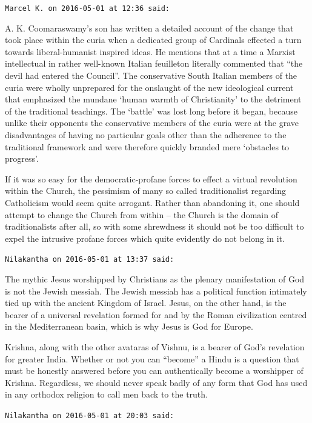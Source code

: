 \begin{footnotesize}
\begin{sffamily}
\texttt{Marcel K. on 2016-05-01 at 12:36 said:}

A. K. Coomaraswamy's son has written a detailed account of the change that took place within the curia when a dedicated group of Cardinals effected a turn towards liberal-humanist inspired ideas. He mentions that at a time a Marxist intellectual in rather well-known Italian feuilleton literally commented that ``the devil had entered the Council''. The conservative South Italian members of the curia were wholly unprepared for the onslaught of the new ideological current that emphasized the mundane `human warmth of Christianity' to the detriment of the traditional teachings. The `battle' was lost long before it began, because unlike their opponents the conservative members of the curia were at the grave disadvantages of having no particular goals other than the adherence to the traditional framework and were therefore quickly branded mere `obstacles to progress'.

If it was so easy for the democratic-profane forces to effect a virtual revolution within the Church, the pessimism of many so called traditionalist regarding Catholicism would seem quite arrogant. Rather than abandoning it, one should attempt to change the Church from within -- the Church is the domain of traditionalists after all, so with some shrewdness it should not be too difficult to expel the intrusive profane forces which quite evidently do not belong in it.

\hfill

\texttt{Nilakantha on 2016-05-01 at 13:37 said:}

The mythic Jesus worshipped by Christians as the plenary manifestation of God is not the Jewish messiah. The Jewish messiah has a political function intimately tied up with the ancient Kingdom of Israel. Jesus, on the other hand, is the bearer of a universal revelation formed for and by the Roman civilization centred in the Mediterranean basin, which is why Jesus is God for Europe.

Krishna, along with the other avataras of Vishnu, is a bearer of God's revelation for greater India. Whether or not you can ``become'' a Hindu is a question that must be honestly answered before you can authentically become a worshipper of Krishna. Regardless, we should never speak badly of any form that God has used in any orthodox religion to call men back to the truth.

\hfill

\texttt{Nilakantha on 2016-05-01 at 20:03 said:}


\end{sffamily}
\end{footnotesize}
